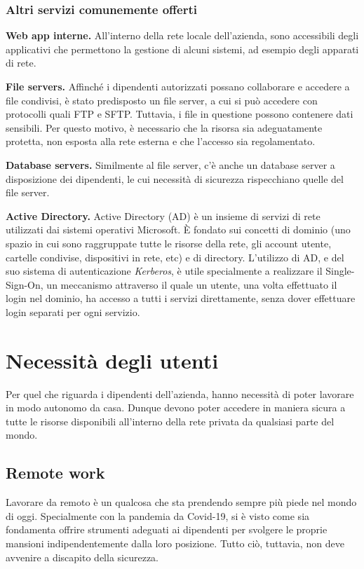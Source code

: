 \subsubsection{Altri servizi comunemente offerti}
\noindent \textbf{Web app interne.}
All'interno della rete locale dell'azienda, sono accessibili degli applicativi che permettono la gestione di alcuni sistemi, ad esempio degli apparati di rete.

\noindent \textbf{File servers.}
Affinché i dipendenti autorizzati possano collaborare e accedere a file condivisi, è stato predisposto un file server, a cui si può accedere con protocolli quali FTP \cite[RFC0791]{RFC0959} e SFTP. Tuttavia, i file in questione possono contenere dati sensibili. Per questo motivo, è necessario che la risorsa sia adeguatamente protetta, non esposta alla rete esterna e che l'accesso sia regolamentato.

\noindent \textbf{Database servers.}
Similmente al file server, c'è anche un database server a disposizione dei dipendenti, le cui necessità di sicurezza rispecchiano quelle del file server.

\noindent \textbf{Active Directory.}
Active Directory (AD) è un insieme di servizi di rete utilizzati dai sistemi operativi Microsoft. È fondato sui concetti di dominio (uno spazio in cui sono raggruppate tutte le risorse della rete, gli account utente, cartelle condivise, dispositivi in rete, etc) e di directory.
L'utilizzo di AD, e del suo sistema di autenticazione \emph{Kerberos}, è utile specialmente a realizzare il Single-Sign-On, un meccanismo attraverso il quale un utente, una volta effettuato il login nel dominio, ha accesso a tutti i servizi direttamente, senza dover effettuare login separati per ogni servizio.

\section{Necessità degli utenti}
Per quel che riguarda i dipendenti dell'azienda, hanno necessità di poter lavorare in modo autonomo da casa. Dunque devono poter accedere in maniera sicura a tutte le risorse disponibili all'interno della rete privata da qualsiasi parte del mondo.
\subsection{Remote work}
Lavorare da remoto è un qualcosa che sta prendendo sempre più piede nel mondo di oggi. Specialmente con la pandemia da Covid-19, si è visto come sia fondamenta offrire strumenti adeguati ai dipendenti per svolgere le proprie mansioni indipendentemente dalla loro posizione.
Tutto ciò, tuttavia, non deve avvenire a discapito della sicurezza.

